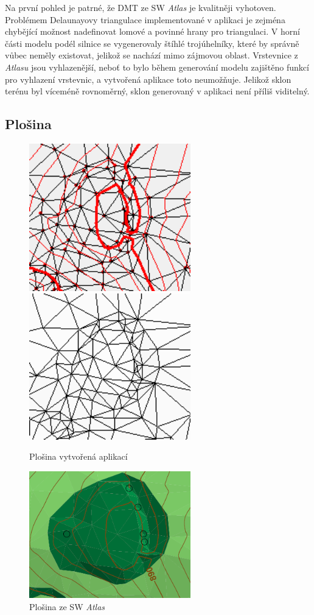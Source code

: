 \documentclass[a4paper, 12pt]{article}
\begin{document}
Na první pohled je patrné, že DMT ze SW \textit{Atlas} je kvalitněji vyhotoven. Problémem  Delaunayovy triangulace implementované v aplikaci je zejména chybějící možnost nadefinovat lomové a povinné hrany pro triangulaci. V horní části modelu podél silnice se vygenerovaly štíhlé trojúhelníky, které by správně vůbec neměly existovat, jelikož se nachází mimo zájmovou oblast. Vrstevnice z \textit{Atlasu} jsou vyhlazenější, neboť to bylo během generování modelu zajištěno funkcí pro vyhlazení vrstevnic, a vytvořená aplikace toto neumožňuje. Jelikož sklon terénu byl víceméně rovnoměrný, sklon generovaný v aplikaci není příliš viditelný. 

\subsection{Plošina}
\begin{figure}[h!]
	\centering
	\includegraphics[width=7cm]{./pictures/kupec_plateau_contours.png}
	\includegraphics[width=7cm]{./pictures/kupec_plateau_slope.png}
	\caption{Plošina vytvořená aplikací}
\end{figure}

\begin{figure}[h!]
	\centering
	\includegraphics[width=7cm]{./pictures/atlas_plateau.png}
	\caption{Plošina ze SW \textit{Atlas}}
\end{figure}
\end{document}
